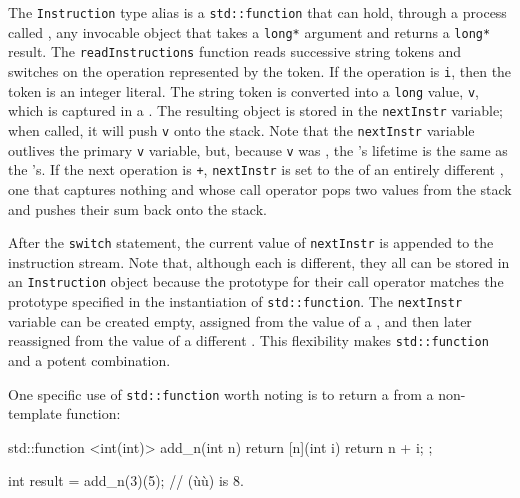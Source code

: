 The \lstinline!Instruction! type alias is a \lstinline!std::function! that can
hold, through a process called , any invocable
object that takes a \lstinline!long*! argument and returns a \lstinline!long*!
result. The \lstinline!readInstructions! function reads successive string
tokens and switches on the operation represented by the token. If the
operation is \lstinline!i!, then the token is an integer literal. The
string token is converted into a \lstinline!long! value, \lstinline!v!, which
is captured in a . The resulting
 object is stored in the \lstinline!nextInstr! variable;
when called, it will push \lstinline!v! onto the stack. Note that the
\lstinline!nextInstr! variable outlives the primary \lstinline!v! variable,
but, because \lstinline!v! was , the
's lifetime is the same as the 's. If the next operation is \lstinline!+!, \lstinline!nextInstr! is
set to the  of an entirely different
, one that captures nothing and whose call
operator pops two values from the stack and pushes their sum back onto
the stack.

After the \lstinline!switch! statement, the current value of
\lstinline!nextInstr! is appended to the instruction stream. Note that,
although each  is different, they all can be stored
in an \lstinline!Instruction! object because the prototype for their call
operator matches the prototype specified in the instantiation of
\lstinline!std::function!. The \lstinline!nextInstr! variable can be created
empty, assigned from the value of a , and then
later reassigned from the value of a different . This flexibility makes \lstinline!std::function! and
 a potent combination.

One specific use of \lstinline!std::function! worth noting is to return a
 from a non-template function:

\begin{emcppslisting}
std::function <int(int)> add_n(int n)
{
    return [n](int i) { return n + i; };
}

int result = add_n(3)(5);  // (ù{}ù) is 8.
\end{emcppslisting}
    

